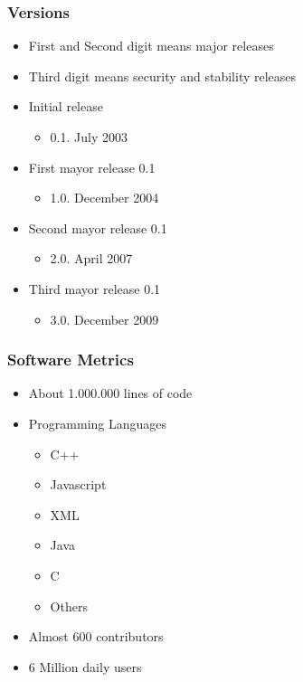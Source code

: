 \documentclass{beamer}
\begin{document}

\begin{frame}
 \frametitle{Versions}
 \begin{itemize}
 \item First and Second digit means major releases
 \item Third digit means security and stability releases
 \item Initial release
    \begin{itemize}
     \item 0.1. July 2003
    \end{itemize}

 \item First mayor release 0.1
    \begin{itemize}
     \item 1.0. December 2004
    \end{itemize}

 \item Second mayor release 0.1
    \begin{itemize}
     \item 2.0. April 2007
    \end{itemize}

 \item Third mayor release 0.1
    \begin{itemize}
     \item 3.0. December 2009
    \end{itemize}

 \end{itemize}
\end{frame}


\begin{frame}
\frametitle{Software Metrics}
 \begin{itemize}
 \item About 1.000.000 lines of code
 \item Programming Languages
    \begin{itemize}
     \item C++
     \item Javascript
     \item XML
     \item Java
     \item C
     \item Others
    \end{itemize}
 \item Almost 600 contributors
 \item 6 Million daily users
 \end{itemize}
\end{frame}
\end{document}
